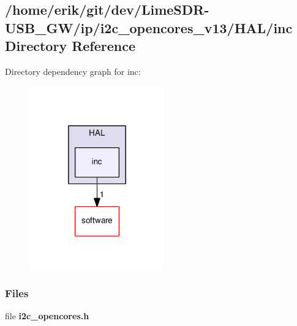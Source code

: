\subsection{/home/erik/git/dev/\+Lime\+S\+D\+R-\/\+U\+S\+B\+\_\+\+G\+W/ip/i2c\+\_\+opencores\+\_\+v13/\+H\+A\+L/inc Directory Reference}
\label{dir_e458eda6270a976b96a63cb1216bc22c}
Directory dependency graph for inc\+:
\nopagebreak
\begin{figure}[H]
\begin{center}
\leavevmode
\includegraphics[width=166pt]{dir_e458eda6270a976b96a63cb1216bc22c_dep}
\end{center}
\end{figure}
\subsubsection*{Files}
\begin{DoxyCompactItemize}
\item 
file {\bf i2c\+\_\+opencores.\+h}
\end{DoxyCompactItemize}
